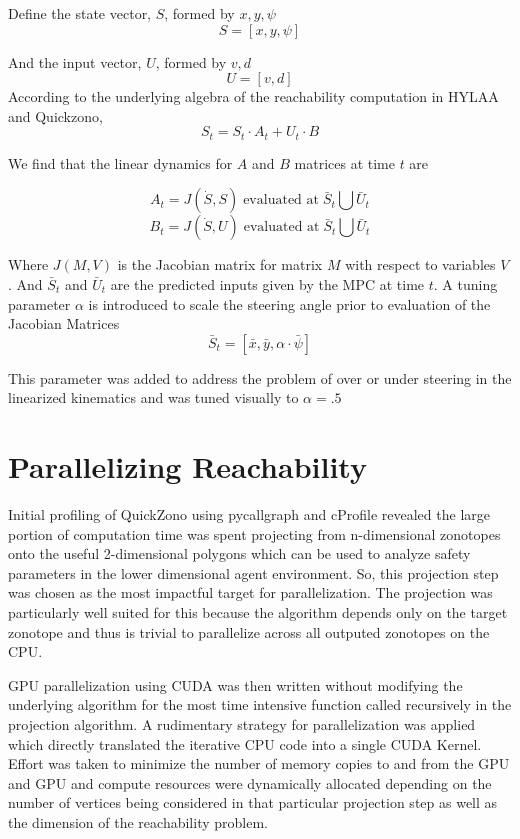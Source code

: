 \documentclass[runningheads]{llncs}
\begin{document}
Define the state vector, $S$, formed by $x, y, \psi$
$$S = [x, y, \psi]$$

And the input vector, $U$, formed by $v, d$
$$ U = [v, d]$$
According to the underlying algebra of the reachability computation in HYLAA and Quickzono, 
$$S_{t} = S_t \cdot A_t + U_t \cdot B$$

We find that the linear dynamics for $A$ and $B$ matrices at time $t$ are

$$A_t = J(\dot{S}, S)\; \text{evaluated at} \;\bar{S}_t \bigcup \bar{U}_t$$
$$B_t =  J(\dot{S}, U)\; \text{evaluated at} \;\bar{S}_t \bigcup \bar{U}_t$$

Where $J(M, V)$ is the Jacobian matrix for matrix $M$ with respect to variables $V$.
And $\bar{S}_t$ and $\bar{U}_t$ are the predicted inputs given by the MPC at time $t$.
A tuning parameter $\alpha$ is introduced to scale the steering angle prior to evaluation of the Jacobian Matrices 
$$\bar{S}_t = [\bar{x}, \bar{y}, \alpha\cdot\bar{\psi}]$$

This parameter was added to address the problem of over or under steering in the linearized kinematics and was tuned visually to $\alpha=.5$ 

\section{Parallelizing Reachability}
Initial profiling of QuickZono using pycallgraph and cProfile revealed the large portion of computation time was spent projecting from n-dimensional zonotopes onto the useful 2-dimensional polygons which can be used to analyze safety parameters in the lower dimensional agent environment. So, this projection step was chosen as the most impactful target for parallelization. The projection was particularly well suited for this because the algorithm depends only on the target zonotope and thus is trivial to parallelize across all outputed zonotopes on the CPU.

GPU parallelization using CUDA was then written without modifying the underlying algorithm for the most time intensive function called recursively in the projection algorithm. A rudimentary strategy for parallelization was applied which directly translated the iterative CPU code into a single CUDA Kernel. Effort was taken to minimize the number of memory copies to and from the GPU and GPU and compute resources were dynamically allocated depending on the number of vertices being considered in that particular projection step as well as the dimension of the reachability problem.
\end{document}
